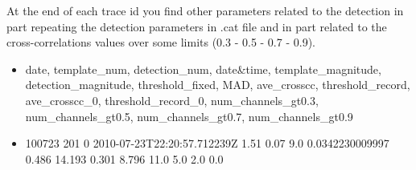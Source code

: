 \documentclass[a4paper,12pt,english]{sphinxmanual}
\begin{document}
At the end of each trace id you find other parameters related to the detection in part repeating the detection parameters
in .cat file and in part related to the cross-correlations values over some limits (0.3 - 0.5 - 0.7 - 0.9).
\begin{itemize}
\item {} 
date, template\_num, detection\_num, date\&time, template\_magnitude, detection\_magnitude, threshold\_fixed, MAD, ave\_crosscc, threshold\_record, ave\_crosscc\_0, threshold\_record\_0, num\_channels\_gt0.3, num\_channels\_gt0.5, num\_channels\_gt0.7, num\_channels\_gt0.9

\item {} 
100723 201 0 2010-07-23T22:20:57.712239Z 1.51 0.07 9.0 0.0342230009997 0.486 14.193 0.301 8.796 11.0 5.0 2.0 0.0

\end{itemize}
\end{document}
